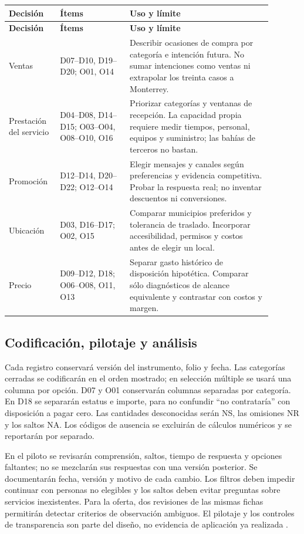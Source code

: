 {\begin{longtable}{p{0.16\linewidth}p{0.24\linewidth}p{0.49\linewidth}}
\textbf{Decisión} & \textbf{Ítems} & \textbf{Uso y límite}\\\hline
\endfirsthead
\textbf{Decisión} & \textbf{Ítems} & \textbf{Uso y límite}\\\hline
\endhead
Ventas & D07--D10, D19--D20; O01, O14 & Describir ocasiones de compra por categoría e intención futura. No sumar intenciones como ventas ni extrapolar los treinta casos a Monterrey.\\
Prestación del servicio & D04--D08, D14--D15; O03--O04, O08--O10, O16 & Priorizar categorías y ventanas de recepción. La capacidad propia requiere medir tiempos, personal, equipos y suministro; las bahías de terceros no bastan.\\
Promoción & D12--D14, D20--D22; O12--O14 & Elegir mensajes y canales según preferencias y evidencia competitiva. Probar la respuesta real; no inventar descuentos ni conversiones.\\
Ubicación & D03, D16--D17; O02, O15 & Comparar municipios preferidos y tolerancia de traslado. Incorporar accesibilidad, permisos y costos antes de elegir un local.\\
Precio & D09--D12, D18; O06--O08, O11, O13 & Separar gasto histórico de disposición hipotética. Comparar sólo diagnósticos de alcance equivalente y contrastar con costos y margen.\\\hline
\end{longtable}

\clearpage
\subsection{Codificación, pilotaje y análisis}
Cada registro conservará versión del instrumento, folio y fecha. Las categorías cerradas se codificarán en el orden mostrado; en selección múltiple se usará una columna por opción. D07 y O01 conservarán columnas separadas por categoría. En D18 se separarán estatus e importe, para no confundir ``no contrataría'' con disposición a pagar cero. Las cantidades desconocidas serán NS, las omisiones NR y los saltos NA. Los códigos de ausencia se excluirán de cálculos numéricos y se reportarán por separado.

En el piloto se revisarán comprensión, saltos, tiempo de respuesta y opciones faltantes; no se mezclarán sus respuestas con una versión posterior. Se documentarán fecha, versión y motivo de cada cambio. Los filtros deben impedir continuar con personas no elegibles y los saltos deben evitar preguntas sobre servicios inexistentes. Para la oferta, dos revisiones de las mismas fichas permitirán detectar criterios de observación ambiguos. El pilotaje y los controles de transparencia son parte del diseño, no evidencia de aplicación ya realizada \citep{aaporBuenasPracticas2022,pewDisenoPreguntas}.

}
